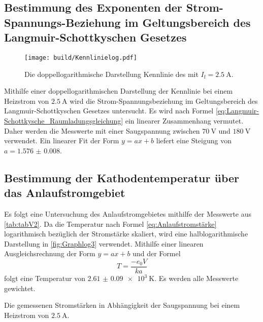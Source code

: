 \subsection{Bestimmung des Exponenten der Strom-Spannungs-Beziehung im Geltungsbereich des Langmuir-Schottkyschen Gesetzes}
\begin{figure}
 \centering
 \caption{Die doppellogarithmische Darstellung Kennlinie des mit $I_\text{f} = \SI{2.5}{\ampere}$.}
 \texttt{[image: build/Kennlinielog.pdf]}
 \label{fig:Graphlog2}
\end{figure}
Mithilfe einer doppellogarithmischen Darstellung der Kennlinie bei einem Heizstrom von $\SI{2.5}{\ampere}$
 wird die Strom-Spannungsbeziehung im Geltungsbereich des Langmuir-Schottkyschen Gesetzes untersucht.
 Es wird nach Formel \ref{eq:Langmuir-Schottkysche_Raumladungsgleichung} ein linearer Zusammenhang vermutet.
Daher werden die Messwerte mit einer Saugspannung zwischen $\SI{70}{\volt}$
und $\SI{180}{\volt}$ verwendet. Ein linearer Fit der Form $y = a x+b$ liefert
eine Steigung von $a = \num{1.576(8)}$.























\subsection{Bestimmung der Kathodentemperatur über das Anlaufstromgebiet}
Es folgt eine Untersuchung des Anlaufstromgebietes mithilfe der Messwerte aus \ref{tab:tabV2}.
Da die Temperatur nach Formel \ref{eq:Anlaufstromstärke} logarithmisch bezüglich
der Stromstärke skaliert, wird eine halblogarithmische Darstellung in
\ref{fig:Graphlog3} verwendet. Mithilfe einer linearen Ausgleichsrechnung der Form
$y = a x+b$ und der Formel
\begin{equation}
  T = \frac{-e_0 V}{k a}
  \end{equation}
  folgt eine Temperatur von $\SI{2.61(9)e3}{\kelvin}$. Es 
werden alle Messwerte gewichtet.


 \begin{table}
  \centering
  \caption{Die gemessenen Stromstärken in Abhängigkeit der Saugspannung bei einem Heizstrom von $\SI{2,5}{\ampere}$.}
  
  \label{tab:tabV2}
 \end{table}


